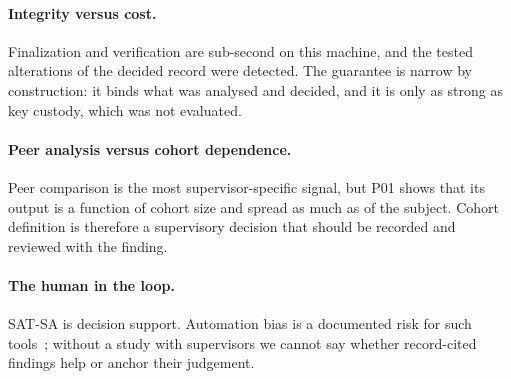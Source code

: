\paragraph{Integrity versus cost.} Finalization and verification are sub-second on this
machine, and the tested alterations of the decided record were detected. The guarantee
is narrow by construction: it binds what was analysed and decided, and it is only as
strong as key custody, which was not evaluated.

\paragraph{Peer analysis versus cohort dependence.} Peer comparison is the most
supervisor-specific signal, but P01 shows that its output is a function of cohort size
and spread as much as of the subject. Cohort definition is therefore a supervisory
decision that should be recorded and reviewed with the finding.

\paragraph{The human in the loop.} SAT-SA is decision support. Automation bias is a
documented risk for such tools~\cite{parasuraman2010automation,tilbury2024automationbias};
without a study with supervisors we cannot say whether record-cited findings help or
anchor their judgement.
